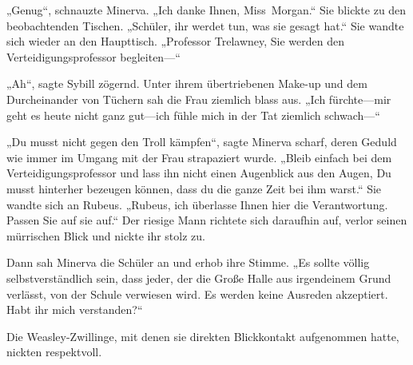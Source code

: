 „Genug“, schnauzte Minerva. „Ich danke Ihnen, Miss~Morgan.“ Sie blickte zu den beobachtenden Tischen. „Schüler, ihr werdet tun, was sie gesagt hat.“ Sie wandte sich wieder an den Haupttisch. „Professor Trelawney, Sie werden den Verteidigungsprofessor begleiten—“

„Ah“, sagte Sybill zögernd. Unter ihrem übertriebenen Make-up und dem Durcheinander von Tüchern sah die Frau ziemlich blass aus. „Ich fürchte—mir geht es heute nicht ganz gut—ich fühle mich in der Tat ziemlich schwach—“

„Du musst nicht gegen den Troll kämpfen“, sagte Minerva scharf, deren Geduld wie immer im Umgang mit der Frau strapaziert wurde. „Bleib einfach bei dem Verteidigungsprofessor und lass ihn nicht einen Augenblick aus den Augen, Du musst hinterher bezeugen können, dass du die ganze Zeit bei ihm warst.“ Sie wandte sich an Rubeus. „Rubeus, ich überlasse Ihnen hier die Verantwortung. Passen Sie auf sie auf.“
Der riesige Mann richtete sich daraufhin auf, verlor seinen mürrischen Blick und nickte ihr stolz zu.

Dann sah Minerva die Schüler an und erhob ihre Stimme. „Es sollte völlig selbstverständlich sein, dass jeder, der die Große Halle aus irgendeinem Grund verlässt, von der Schule verwiesen wird. Es werden keine Ausreden akzeptiert. Habt ihr mich verstanden?“

Die Weasley-Zwillinge, mit denen sie direkten Blickkontakt aufgenommen hatte, nickten respektvoll.

